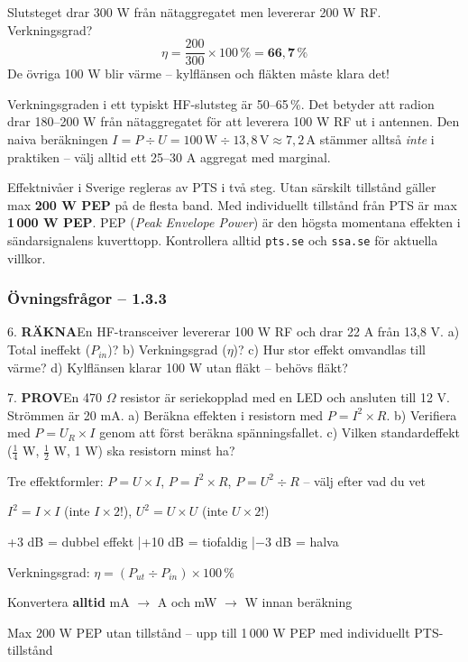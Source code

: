\documentclass[a4paper,11pt,twoside]{book}
\newcommand{\emoji}[1]{{\emojifont #1}}
\newcommand{\qrakna}{\colorbox{bluepale}{\textcolor{bluedark}{\headingfont\bfseries\tiny RÄKNA}}}
\newcommand{\qprov}{\colorbox{redpale}{\textcolor{reddark}{\headingfont\bfseries\tiny PROV}}}
\begin{document}
\begin{worked}[title={Räkneexempel 1.3.3-1 – Slutstegets verkningsgrad}]
Slutsteget drar 300 W från nätaggregatet men levererar 200 W RF. Verkningsgrad?
\[ \eta = \frac{200}{300} \times 100\,\% = \mathbf{66{,}7\,\%} \]
De övriga 100 W blir värme – kylflänsen och fläkten måste klara det!
\end{worked}

Verkningsgraden i ett typiskt HF-slutsteg är 50–65\,\%. Det betyder att radion drar 180–200 W från nätaggregatet för att leverera 100 W RF ut i antennen. Den naiva beräkningen $I = P \div U = 100\,\text{W} \div 13{,}8\,\text{V} \approx 7{,}2\,\text{A}$ stämmer alltså \emph{inte} i praktiken – välj alltid ett 25–30 A aggregat med marginal.

Effektnivåer i Sverige regleras av PTS i två steg. Utan särskilt tillstånd gäller max \textbf{200 W PEP} på de flesta band. Med individuellt tillstånd från PTS är max \textbf{1\,000 W PEP}. PEP (\emph{Peak Envelope Power}) är den högsta momentana effekten i sändarsignalens kuverttopp. Kontrollera alltid \texttt{pts.se} och \texttt{ssa.se} för aktuella villkor.

\subsubsection*{Övningsfrågor – 1.3.3}

\begin{qblock}{6.}
\qrakna\quad En HF-transceiver levererar 100 W RF och drar 22 A från 13,8 V. a) Total ineffekt ($P_{in}$)? b) Verkningsgrad ($\eta$)? c) Hur stor effekt omvandlas till värme? d) Kylflänsen klarar 100 W utan fläkt – behövs fläkt?
\end{qblock}

\begin{qblock}{7.}
\qprov\quad En 470 $\Omega$ resistor är seriekopplad med en LED och ansluten till 12 V. Strömmen är 20 mA. a) Beräkna effekten i resistorn med $P = I^2 \times R$. b) Verifiera med $P = U_R \times I$ genom att först beräkna spänningsfallet. c) Vilken standardeffekt ($\frac{1}{4}$ W, $\frac{1}{2}$ W, 1 W) ska resistorn minst ha?
\end{qblock}

\begin{orangebox}[title={\emoji{🎯} Viktigt för provet}]
\begin{checklist}
  \item Tre effektformler: $P = U \times I$, $P = I^2 \times R$, $P = U^2 \div R$ – välj efter vad du vet
  \item $I^2 = I \times I$ (inte $I \times 2$!), $U^2 = U \times U$ (inte $U \times 2$!)
  \item +3 dB = dubbel effekt \quad|\quad +10 dB = tiofaldig \quad|\quad $-$3 dB = halva
  \item Verkningsgrad: $\eta = (P_{ut} \div P_{in}) \times 100\,\%$
  \item Konvertera \textbf{alltid} mA $\rightarrow$ A och mW $\rightarrow$ W innan beräkning
  \item Max 200 W PEP utan tillstånd – upp till 1\,000 W PEP med individuellt PTS-tillstånd
\end{checklist}
\end{orangebox}
\end{document}
